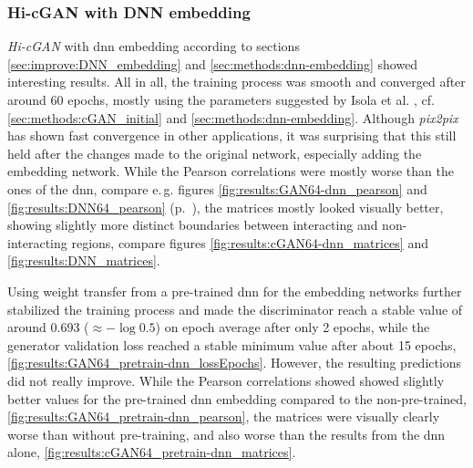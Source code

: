 \subsubsection{Hi-cGAN with DNN embedding} \label{sec:results:cgan_dnn}
\emph{Hi-cGAN} with \acrshort{dnn} embedding according to sections \ref{sec:improve:DNN_embedding} and \ref{sec:methods:dnn-embedding} showed interesting results.
All in all, the training process was smooth and converged after around 60 epochs, mostly using the parameters suggested
by Isola et al. \cite{Isola2017}, cf. \cref{sec:methods:cGAN_initial} and \ref{sec:methods:dnn-embedding}. 
Although \emph{pix2pix} has shown fast convergence in other applications, 
it was surprising that this still held after the changes made to the original network, especially adding the embedding network. 
While the Pearson correlations were mostly worse than the ones of the \acrshort{dnn}, compare e.\,g. figures \ref{fig:results:GAN64-dnn_pearson} and \ref{fig:results:DNN64_pearson} (p.~\pageref{fig:results:DNN64_pearson}),
the matrices mostly looked visually better, showing slightly  more distinct boundaries between interacting and non-interacting regions, compare figures \ref{fig:results:cGAN64-dnn_matrices} and \ref{fig:results:DNN_matrices}.

Using weight transfer from a pre-trained \acrshort{dnn} for the embedding networks further stabilized the training process 
and made the discriminator reach a stable value of around 0.693 ($\approx -\log0.5$) on epoch average after only 2 epochs, 
while the generator validation loss reached a stable minimum value after about 15 epochs, \cref{fig:results:GAN64_pretrain-dnn_lossEpochs}.
However, the resulting predictions did not really improve.
While the Pearson correlations showed showed slightly better values for the pre-trained \acrshort{dnn} embedding compared to the non-pre-trained, \cref{fig:results:GAN64_pretrain-dnn_pearson},
the matrices were visually clearly worse than without pre-training, and also worse than the results from the \acrshort{dnn} alone, \cref{fig:results:cGAN64_pretrain-dnn_matrices}.

